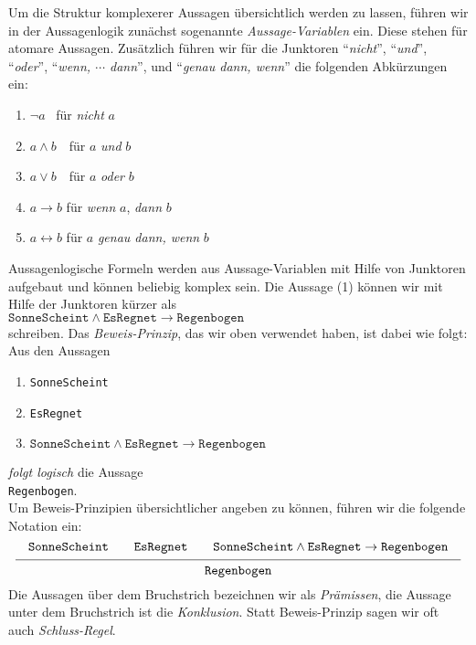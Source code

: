 Um die Struktur komplexerer Aussagen \"{u}bersichtlich werden zu lassen, f\"{u}hren wir in der Aussagenlogik zun\"{a}chst sogenannte
\emph{Aussage-Variablen} ein.  Diese stehen f\"{u}r atomare Aussagen.
Zus\"{a}tzlich f\"{u}hren wir f\"{u}r die Junktoren
``\textsl{nicht}'', ``\textsl{und}'', ``\textsl{oder}'', ``\textsl{wenn, $\cdots$ dann}'', und ``\textsl{genau dann, wenn}'' die
folgenden Abk\"{u}rzungen ein:
\begin{enumerate}
\item $\neg a$ \quad\quad\ f\"{u}r \quad \textsl{nicht} $a$ 
\item $a \wedge b$ \,\quad\ f\"{u}r \quad $a$ \textsl{und} $b$
\item $a \vee b$ \,\quad\ f\"{u}r \quad $a$ \textsl{oder} $b$
\item $a \rightarrow b$   \quad f\"{u}r \quad \textsl{wenn} $a$, \textsl{dann} $b$
\item $a \leftrightarrow b$ \quad f\"{u}r \quad  $a$ \textsl{genau dann, wenn} $b$
\end{enumerate}
Aussagenlogische Formeln werden aus Aussage-Variablen mit Hilfe von Junktoren aufgebaut
und k\"{o}nnen beliebig komplex sein.  Die Aussage (1) k\"{o}nnen wir mit Hilfe der Junktoren  k\"{u}rzer als
 \\[0.2cm]
\hspace*{1.3cm} $\mathtt{SonneScheint} \wedge \mathtt{EsRegnet} \rightarrow \mathtt{Regenbogen}$ \\[0.2cm]
schreiben.   Das \emph{Beweis-Prinzip}, das wir oben
verwendet haben, ist dabei wie folgt: Aus den Aussagen
\begin{enumerate}
\item \texttt{SonneScheint}
\item \texttt{EsRegnet}
\item $\mathtt{SonneScheint} \wedge \mathtt{EsRegnet} \rightarrow \mathtt{Regenbogen}$
\end{enumerate}
\emph{folgt logisch} die Aussage \\[0.2cm]
\hspace*{1.3cm}  \texttt{Regenbogen}. \\[0.2cm]
 Um Beweis-Prinzipien \"{u}bersichtlicher angeben zu k\"{o}nnen,
f\"{u}hren wir die folgende Notation ein: 
$$ \schluss{\mathtt{SonneScheint} \quad\quad \mathtt{EsRegnet} \quad\quad \mathtt{SonneScheint} \wedge \mathtt{EsRegnet} \rightarrow
       \mathtt{Regenbogen}}{\mathtt{Regenbogen}} 
$$
Die Aussagen \"{u}ber dem Bruchstrich bezeichnen wir als \emph{Pr\"{a}missen}, die Aussage unter dem Bruchstrich ist die \emph{Konklusion}.
Statt Beweis-Prinzip sagen wir oft auch \emph{Schluss-Regel}.

